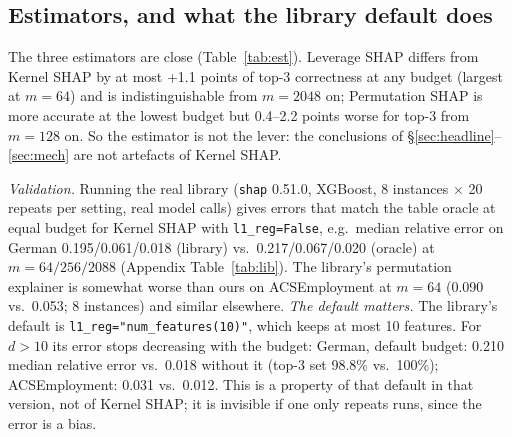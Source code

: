 \documentclass{article}
\begin{document}
\subsection{Estimators, and what the library default does}\label{sec:est}
\begin{table}[t]
\centering\small

\caption{Estimators at equal budget, $d\ge16$ (336 instance--model pairs): pooled P(top-3 set correct) and median relative $\ell_2$ error. Paired differences in top-3 correctness (Leverage$-$Kernel, Permutation$-$Kernel, 95\% CI): $m{=}64$: +1.1 [0.4, 1.8] / +2.9 [1.9, 3.9] points; $m{=}256$: +0.4 [$-$0.1, 0.9] / $-$2.2 [$-$2.9, $-$1.4]; $m{=}2048$: $-$0.0 [$-$0.2, 0.1] / $-$0.9 [$-$1.3, $-$0.6].}\label{tab:est}
\end{table}
The three estimators are close (Table~\ref{tab:est}). Leverage SHAP differs from Kernel SHAP by at most +1.1 points of top-3 correctness at any budget (largest at $m{=}64$) and is indistinguishable from $m{=}2048$ on; Permutation SHAP is more accurate at the lowest budget but 0.4--2.2 points worse for top-3 from $m{=}128$ on. So the estimator is not the lever: the conclusions of \S\ref{sec:headline}--\ref{sec:mech} are not artefacts of Kernel SHAP.

\emph{Validation.} Running the real library (\texttt{shap} 0.51.0, XGBoost, 8 instances $\times$ 20 repeats per setting, real model calls) gives errors that match the table oracle at equal budget for Kernel SHAP with \texttt{l1\_reg=False}, e.g.\ median relative error on German 0.195/0.061/0.018 (library) vs.\ 0.217/0.067/0.020 (oracle) at $m{=}64/256/2088$ (Appendix Table~\ref{tab:lib}). The library's permutation explainer is somewhat worse than ours on ACSEmployment at $m{=}64$ (0.090 vs.\ 0.053; 8 instances) and similar elsewhere. \emph{The default matters.} The library's default is \texttt{l1\_reg="num\_features(10)"}, which keeps at most 10 features. For $d>10$ its error stops decreasing with the budget: German, default budget: 0.210 median relative error vs.\ 0.018 without it (top-3 set 98.8\% vs.\ 100\%); ACSEmployment: 0.031 vs.\ 0.012. This is a property of that default in that version, not of Kernel SHAP; it is invisible if one only repeats runs, since the error is a bias.
\end{document}
